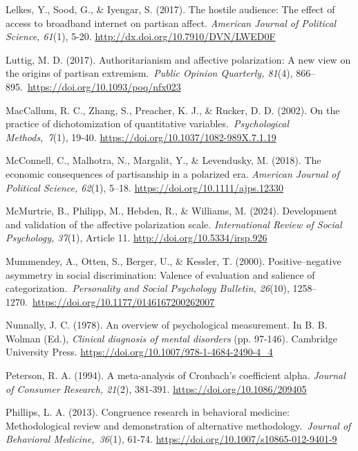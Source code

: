 \documentclass[authordate, meta]{jote-new-article}
\begin{document}
	Lelkes, Y., Sood, G., \& Iyengar, S. (2017). The hostile audience: The effect of access to broadband internet on partisan affect. \emph{American Journal of Political Science, 61}(1), 5-20. \url{http://dx.doi.org/10.7910/DVN/LWED0F}



	Luttig, M. D. (2017). Authoritarianism and affective polarization: A new view on the origins of partisan extremism. \emph{Public Opinion Quarterly, 81}(4), 866--895. \url{https://doi.org/10.1093/poq/nfx023}



	MacCallum, R. C., Zhang, S., Preacher, K. J., \& Rucker, D. D. (2002). On the practice of dichotomization of quantitative variables.\emph{ Psychological Methods, 7}(1), 19-40. \url{https://doi.org/10.1037/1082-989X.7.1.19}



	McConnell, C., Malhotra, N., Margalit, Y., \& Levendusky, M. (2018). The economic consequences of partisanship in a polarized era. \emph{American Journal of Political Science, 62}(1), 5--18. \url{https://doi.org/10.1111/ajps.12330}



	McMurtrie, B., Philipp, M., Hebden, R., \& Williams, M. (2024). Development and validation of the affective polarization scale. \emph{International Review of Social Psychology, 37}(1), Article 11. \url{http://doi.org/10.5334/irsp.926}



	Mummendey, A., Otten, S., Berger, U., \& Kessler, T. (2000). Positive--negative asymmetry in social discrimination: Valence of evaluation and salience of categorization. \emph{Personality and Social Psychology Bulletin, 26}(10), 1258--1270. \url{https://doi.org/10.1177/0146167200262007}



	Nunnally, J. C. (1978). An overview of psychological measurement. In B. B. Wolman (Ed.), \emph{Clinical diagnosis of mental disorders }(pp. 97-146). Cambridge University Press. \url{https://doi.org/10.1007/978-1-4684-2490-4\_4}



	Peterson, R. A. (1994). A meta-analysis of Cronbach's coefficient alpha. \emph{Journal of Consumer Research, 21}(2), 381-391. \url{https://doi.org/10.1086/209405}



	Phillips, L. A. (2013). Congruence research in behavioral medicine: Methodological review and demonstration of alternative methodology.\emph{ Journal of Behavioral Medicine, 36}(1), 61-74. \url{https://doi.org/10.1007/s10865-012-9401-9}
\end{document}
